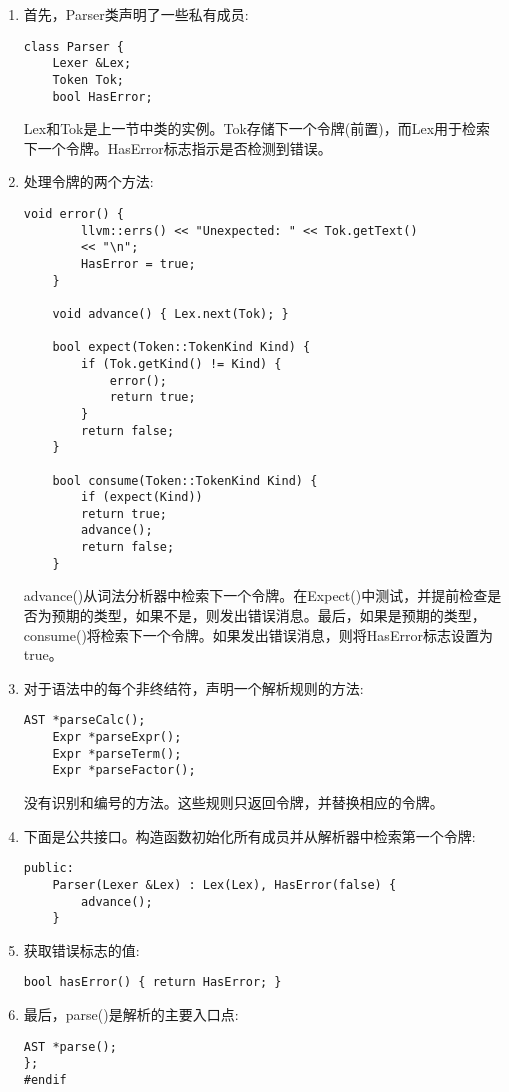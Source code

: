 \begin{enumerate}
\item 首先，Parser类声明了一些私有成员:
\begin{lstlisting}[caption={}]
class Parser {
	Lexer &Lex;
	Token Tok;
	bool HasError;
\end{lstlisting}
Lex和Tok是上一节中类的实例。Tok存储下一个令牌(前置)，而Lex用于检索下一个令牌。HasError标志指示是否检测到错误。

\item 处理令牌的两个方法:
\begin{lstlisting}[caption={}]
	void error() {
		llvm::errs() << "Unexpected: " << Tok.getText()
		<< "\n";
		HasError = true;
	}
	
	void advance() { Lex.next(Tok); }
	
	bool expect(Token::TokenKind Kind) {
		if (Tok.getKind() != Kind) {
			error();
			return true;
		}
		return false;
	}
	
	bool consume(Token::TokenKind Kind) {
		if (expect(Kind))
		return true;
		advance();
		return false;
	}
\end{lstlisting}
advance()从词法分析器中检索下一个令牌。在Expect()中测试，并提前检查是否为预期的类型，如果不是，则发出错误消息。最后，如果是预期的类型，consume()将检索下一个令牌。如果发出错误消息，则将HasError标志设置为true。\par

\item 对于语法中的每个非终结符，声明一个解析规则的方法:
\begin{lstlisting}[caption={}]
	AST *parseCalc();
	Expr *parseExpr();
	Expr *parseTerm();
	Expr *parseFactor();
\end{lstlisting}
\begin{tcolorbox}[colback=blue!5!white,colframe=blue!75!black, title=Note]
没有识别和编号的方法。这些规则只返回令牌，并替换相应的令牌。
\end{tcolorbox}

\item 下面是公共接口。构造函数初始化所有成员并从解析器中检索第一个令牌:
\begin{lstlisting}[caption={}]
	public:
	Parser(Lexer &Lex) : Lex(Lex), HasError(false) {
		advance();
	}
\end{lstlisting}

\item 获取错误标志的值:
\begin{lstlisting}[caption={}]
	bool hasError() { return HasError; }
\end{lstlisting}

\item 最后，parse()是解析的主要入口点:
\begin{lstlisting}[caption={}]
	AST *parse();
};
#endif
\end{lstlisting}
	
\end{enumerate}

